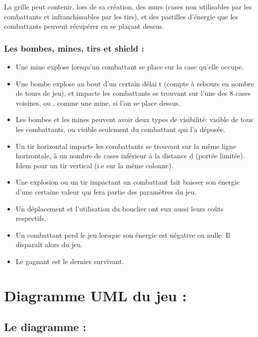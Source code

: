 \documentclass{article}
\begin{document}
La grille peut contenir, lors de sa création, des murs (cases non utilisables par les combattants et infranchissables par les tirs), et des pastilles d'énergie que les combattants peuvent récupérer en se plaçant dessus.

\vspace{1\baselineskip}

\subsubsection{Les bombes, mines, tirs et shield :}

\vspace{1\baselineskip}

\begin{itemize}
    \item Une mine explose lorsqu'un combattant se place sur la case qu'elle occupe.
    \item Une bombe explose au bout d'un certain délai t (compte à rebours en nombre de tours de jeu),
	et impacte les combattants se trouvant sur l'une des 8 cases voisines, ou , comme une mine,	si l'on se place dessus.
	\item Les bombes et les mines peuvent avoir deux types de visibilité: visible de tous les combattants, ou visible seulement du combattant qui l'a déposée.
	\item Un tir horizontal impacte les combattants se trouvant sur la même ligne horizontale, à un nombre de cases inférieur à la distance d (portée limitée). Idem pour un tir vertical (i.e sur la même
	colonne).
	\item Une explosion ou un tir impactant un combattant fait baisser son énergie d'une certaine valeur qui fera partie des paramètres du jeu.
	\item Un déplacement et l'utilisation du bouclier ont eux aussi leurs coûts respectifs.
    \item Un combattant perd le jeu lorsque son énergie est négative ou nulle. Il disparaît alors du jeu.
    \item Le gagnant est le dernier survivant.
\end{itemize}

\vspace{1\baselineskip}

\section{Diagramme UML du jeu :}

\subsection{Le diagramme :}
\end{document}
